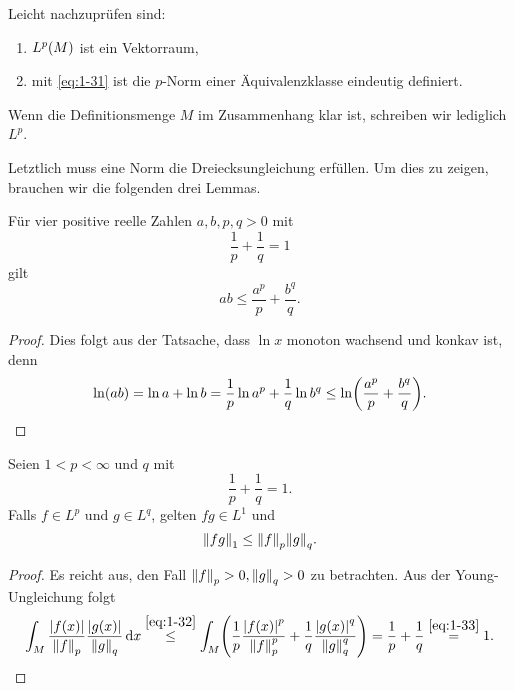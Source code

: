 Leicht nachzuprüfen sind:
\begin{enumerate}
	\item \(L^p\parentheses*{M}\) ist ein Vektorraum,
	\item mit \eqref{eq:1-31} ist die \(p\)-Norm einer Äquivalenzklasse eindeutig definiert.
\end{enumerate}
Wenn die Definitionsmenge \(M\) im Zusammenhang klar ist, schreiben wir lediglich \(L^p\).

Letztlich muss eine Norm die Dreiecksungleichung erfüllen.
Um dies zu zeigen, brauchen wir die folgenden drei Lemmas.

\begin{lemma}
	Für vier positive reelle Zahlen \(a, b, p, q > 0\) mit
	\[
		\frac{1}{p} + \frac{1}{q} = 1
	\]
	gilt
	\begin{equation}\label{eq:1-32}
		ab \le \frac{a^p}{p} + \frac{b^q}{q}.
	\end{equation}
\end{lemma}

\begin{proof}
	Dies folgt aus der Tatsache, dass \(\ln x\) monoton wachsend und konkav ist, denn
	\[
		\ln\parentheses*{ab} = \ln a + \ln b = \frac{1}{p}\ln a^p + \frac{1}{q}\ln b^q \le \ln\parentheses*{\frac{a^p}{p} + \frac{b^q}{q}}.
	\]
\end{proof}

\begin{lemma}
	Seien \(1 < p < \infty\) und \(q\) mit
	\begin{equation}\label{eq:1-33}
		\frac{1}{p} + \frac{1}{q} = 1.
	\end{equation}
	Falls \(f \in L^p\) und \(g \in L^q\), gelten \(fg \in L^1\) und
	\begin{equation}\label{eq:1-34}
		\norm*{fg}_1 \le \norm*{f}_p \norm*{g}_q.
	\end{equation}
\end{lemma}

\begin{proof}
	Es reicht aus, den Fall \(\norm*{f}_p > 0, \norm*{g}_q > 0\) zu betrachten.
	Aus der Young-Ungleichung folgt
	\[
		\int_M \frac{\absolute*{f\parentheses*{x}}}{\norm*{f}_p}\frac{\absolute*{g\parentheses*{x}}}{\norm*{g}_q}\d x \stackrel{\eqref{eq:1-32}}{\le} \int_M \parentheses*{\frac{1}{p}\frac{\absolute*{f\parentheses*{x}}^p}{\norm*{f}_p^p} + \frac{1}{q}\frac{\absolute*{g\parentheses*{x}}^q}{\norm*{g}_q^q}} = \frac{1}{p} + \frac{1}{q} \stackrel{\eqref{eq:1-33}}{=} 1.
	\]
\end{proof}

